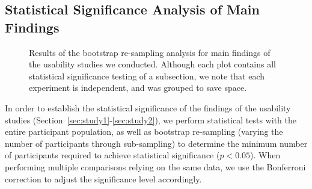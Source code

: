 \documentclass[manuscript]{acmart}
\begin{document}
\subsection{Statistical Significance Analysis of Main Findings} \label{app:stats_significance}

\begin{figure*}
    \centering
    \begin{minipage}[t]{0.45\textwidth}
    \end{minipage}\hfill
    \begin{minipage}[t]{.45\textwidth}
    \end{minipage}\hfill
    \vspace{0.7cm}
    \begin{minipage}[t]{.45\textwidth}
    \end{minipage} \hfill
    \begin{minipage}[t]{.45\textwidth}
    \end{minipage}
    \caption{Results of the bootstrap re-sampling analysis for main findings of the usability studies we conducted. Although each plot contains all statistical significance testing of a subsection, we note that each experiment is independent, and was grouped to save space.}
    \label{fig:stat_sig}    
\end{figure*}

In order to establish the statistical significance of the findings of the usability studies (Section~\ref{sec:study1}-\ref{sec:study2}), we perform statistical tests with the entire participant population, as well as bootstrap re-sampling \cite{efron1982jackknife} (varying the number of participants through sub-sampling) to determine the minimum number of participants required to achieve statistical significance ($p < 0.05$). When performing multiple comparisons relying on the same data, we use the Bonferroni correction \cite{bonferroni1935calcolo} to adjust the significance level accordingly.
\end{document}
